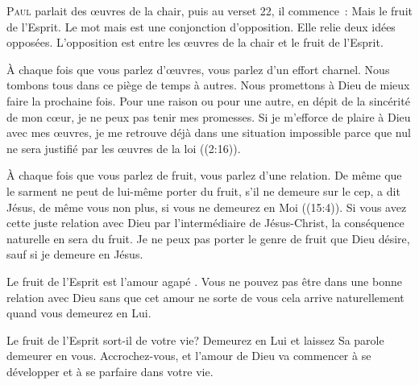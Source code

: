 





\lettrine{P}{aul} parlait des œuvres de la chair,
 puis au verset 22, il commence~: 
 \og Mais le fruit de l'Esprit. \fg{}
 Le mot \og mais \fg{} est une conjonction d'opposition.
 Elle relie deux idées opposées.
 L'opposition est entre les œuvres de la chair et le fruit de l'Esprit.

À chaque fois que vous parlez d'œuvres, vous parlez d'un effort charnel.
 Nous tombons tous dans ce piège de temps à autres. Nous promettons à Dieu
 de mieux faire la prochaine fois. Pour une raison ou pour une autre,
 en dépit de la sincérité de mon cœur, je ne peux pas tenir mes promesses.
 Si je m'efforce de plaire à Dieu avec mes œuvres, je me retrouve déjà
 dans une situation impossible parce que 
 \og nul ne sera justifié par les œuvres de la loi \fg{}
 ((2:16)). 



À chaque fois que vous parlez de fruit, vous parlez d'une relation.
 \og De même que le sarment ne peut de lui-même porter du fruit,
 s'il ne demeure sur le cep, a dit Jésus, 
 de même vous non plus, si vous ne demeurez en Moi \fg{}
 ((15:4)).
 Si vous avez cette juste relation avec Dieu par l'intermédiaire de Jésus-Christ,
 la conséquence naturelle en sera du fruit. Je ne peux pas porter
 le genre de fruit que Dieu désire, sauf si je demeure en Jésus.

Le fruit de l'Esprit est l'amour \og agapé \fg{}. Vous ne pouvez pas être
 dans une bonne relation avec Dieu sans que cet amour ne sorte de vous
 \ocadr cela arrive naturellement quand vous demeurez en Lui.

Le fruit de l'Esprit sort-il de votre vie? Demeurez en Lui et laissez Sa parole
 demeurer en vous. Accrochez-vous, et l'amour de Dieu va commencer
 à se développer et à se parfaire dans votre vie.

